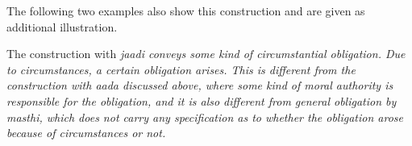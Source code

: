 The following two examples also show this construction and are given as additional illustration.



The construction with \em jaadi \em conveys some kind of circumstantial obligation. Due to  circumstances, a certain obligation arises. This is different from the construction with \em aada \em discussed above, where some kind of moral authority is responsible for the obligation, and it is also different from general obligation by \em masthi\em, which does not carry any specification as to whether the obligation arose because of circumstances or not.


 
 
% 
% 


